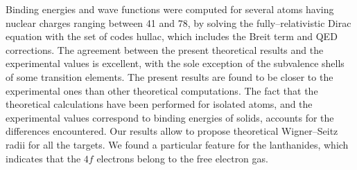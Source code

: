Binding energies and wave functions were computed for several atoms
having nuclear charges ranging between 41 and 78, by solving the
fully--relativistic Dirac equation with the set of codes {\sc hullac}, which
includes the Breit term and QED corrections. The agreement between the
present theoretical results and the experimental values is excellent,
with the sole exception of the subvalence shells of some transition
elements. The present results are found to be closer to the experimental 
ones than other theoretical computations. 
The fact that the theoretical calculations have been performed
for isolated atoms, and
the experimental values correspond to binding energies of solids,
accounts for the differences encountered. 
Our results allow to propose theoretical Wigner--Seitz radii for all 
the targets. We found a particular feature for the lanthanides, which
indicates that the $4f$ electrons belong to the free electron gas.

